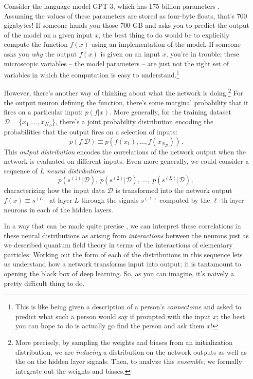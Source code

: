 \documentclass[12pt]{article}
\newcommand{\be}{\begin{equation}}
\newcommand{\ee}{\end{equation}}
\renewcommand{\le}{\left}
\newcommand{\ri}{\right}
\begin{document}
Consider the language model GPT-3, which has 175 billion parameters \cite{Brown2020LanguageMA}. Assuming the values of these parameters are stored as four-byte floats, that's 700 gigabytes! If someone hands you those 700 GB and asks you to predict the output of the model on a given input $x$, the best thing to do would be to 
explicitly compute the function $f(x)$ using an implementation of the model. If someone asks you \emph{why} the output $f(x)$ is given on an input $x$, you're in trouble; these microscopic variables -- the model parameters -- are just not the right set of variables in which the computation is easy to understand.\footnote{This is like being given a description of a person's \emph{connectome} and asked to predict what such a person would say if prompted with the input $x$; the best you can hope to do is actually go find the person and ask them $x$!}



However, there's another way of thinking about what the network is doing.\footnote{
    More precisely, by sampling the weights and biases from an initialization distribution, we are \emph{inducing} a distribution on the network outputs as well as the on the hidden layer signals. Then, to analyze this \emph{ensemble}, we formally integrate out the weights and biases. 
} For the output neuron defining the function, there's some marginal probability that it fires on a particular input: $p(f | x)$. 
More generally, for the training dataset $\mathcal{D} = \{x_1, \dots, x_{N_\mathcal{D}} \}$, there's a joint probability distribution encoding the probabilities that the output fires on a selection of inputs: %
\be\label{eq:network-output}
p(f | \mathcal{D}) \equiv p\le(f(x_1), \dots, f(x_{N_\mathcal{D}}) \ri) \, . 
\ee
This \emph{output distribution} encodes the correlations of the network output when the network is evaluated on different inputs.
Even more generally, we could consider a sequence of $L$ \emph{neural distributions} 
\be\label{eq:neural-distribution-sequence}
p(s^{(1)} | \mathcal{D}),~ p(s^{(2)} | \mathcal{D}),~   \dots,~ p(s^{(L)} | \mathcal{D})\, ,
\ee 
characterizing how the input data $\mathcal{D}$ is transformed into the network output $f(x) \equiv s^{(L)}$ at layer $L$ through the signals $s^{(\ell)}$ computed by the $\ell$-th layer neurons in each of the hidden layers.


In a way that can be made quite precise \cite{Principles}, we can interpret these correlations in these neural distributions as arising from \emph{interactions} between the neurons just as we described quantum field theory in terms of the interactions of elementary particles. Working out the form of each of the distributions in this sequence lets us understand how a network transforms input into output; it is tantamount to opening the black box of deep learning. So, as you can imagine, it's naively a pretty difficult thing to do.
\end{document}
